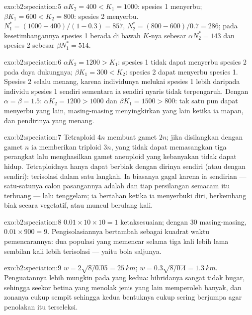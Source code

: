 \begin{solution}{exo:b2:speciation:5}
$\alpha K_2 = 400 < K_1 = 1000$: spesies 1 menyerbu; $\beta K_1 = 600
< K_2 = 800$: spesies 2 menyerbu. $N_1^{*} = (1000 - 400)/(1 - 0.3) =
857$, $N_2^{*} = (800 - 600)/0.7 = 286$; pada kesetimbangannya spesies
1 berada di bawah $K$-nya sebesar $\alpha N_2^{*} = 143$ dan spesies 2
sebesar $\beta
N_1^{*} = 514$.
\end{solution}

\begin{solution}{exo:b2:speciation:6}
$\alpha K_2 = 1200 > K_1$: spesies 1 tidak dapat menyerbu spesies 2
pada daya dukungnya; $\beta K_1 = 300 < K_2$: spesies 2 dapat menyerbu
spesies 1. Spesies 2 selalu menang, karena individunya melukai spesies
1 lebih daripada individu spesies 1 sendiri sementara ia sendiri nyaris
tidak terpengaruh. Dengan $\alpha = \beta = 1.5$: $\alpha K_2 = 1200 > 1000$
dan $\beta K_1 = 1500 > 800$: tak satu pun dapat menyerbu yang lain,
masing-masing menyingkirkan yang lain ketika ia mapan, dan pendirinya
yang menang.
\end{solution}

\begin{solution}{exo:b2:speciation:7}
Tetraploid $4n$ membuat gamet $2n$; jika disilangkan dengan gamet $n$
 ia memberikan triploid $3n$, yang  tidak dapat
memasangkan tiga perangkat lalu menghasilkan gamet aneuploid yang
kebanyakan tidak dapat hidup. Tetraploidnya hanya dapat berbiak dengan
dirinya sendiri (atau dengan  sendiri): terisolasi dalam
satu langkah. Ia biasanya gagal karena ia sendirian --- satu-satunya
calon pasangannya adalah  dan tiap persilangan semacam itu
terbuang --- lalu tenggelam; ia bertahan ketika ia menyerbuki diri,
berkembang biak secara vegetatif, atau muncul berulang kali.
\end{solution}

\begin{solution}{exo:b2:speciation:8}
$0.01\times 10\times 10 = 1$ ketaksesuaian; dengan 30 masing-masing,
$0.01\times
900 = 9$. Pengisolasiannya bertambah sebagai kuadrat waktu
pemencarannya: dua populasi yang memencar selama tiga kali lebih lama
sembilan kali lebih terisolasi --- yaitu bola saljunya.
\end{solution}

\begin{solution}{exo:b2:speciation:9}
$w = 2\sqrt{8/0.05} = \qty{25}{km}$; $w = 0.3\sqrt{8/0.4} =
\qty{1.3}{km}$. Penguatannya lebih mungkin pada yang kedua: hibridanya
sangat tidak bugar, sehingga seekor betina yang menolak jenis yang lain
memperoleh banyak, dan zonanya cukup sempit sehingga kedua bentuknya
cukup sering berjumpa agar penolakan itu terseleksi.
\end{solution}

